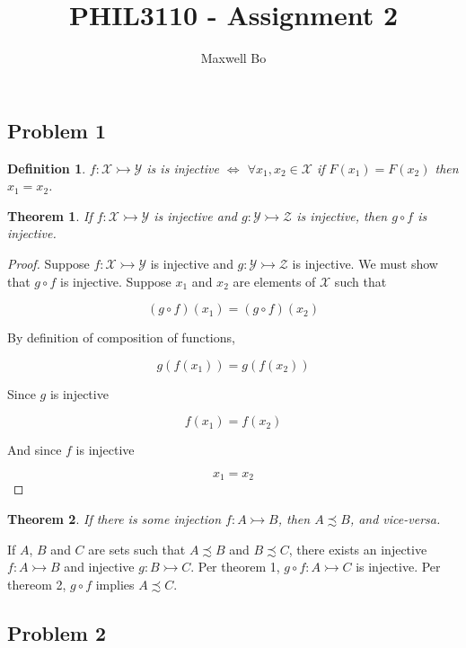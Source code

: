 \documentclass[a4paper]{article}
\title{PHIL3110 - Assignment 2}
\author{Maxwell Bo}
\newtheorem{theorem}{Theorem}
\newtheorem{definition}{Definition}
\newtheorem{proof}{Proof}
\begin{document}
 

\maketitle

\subsection*{Problem 1}

\begin{definition}
$f: \mathcal{X} \rightarrowtail \mathcal{Y}$ is is injective $\Leftrightarrow$ $\forall x_1, x_2 \in \mathcal{X}$ if $F(x_1) = F(x_2)$ then $x_1 = x_2$.
\end{definition}

\begin{theorem}
    If $f: \mathcal{X} \rightarrowtail \mathcal{Y}$ is injective and $g: \mathcal{Y} \rightarrowtail \mathcal{Z}$ is injective, then $g \circ f$ is injective.
\end{theorem}

\begin{proof}
Suppose $f: \mathcal{X} \rightarrowtail \mathcal{Y}$ is injective and $g: \mathcal{Y} \rightarrowtail \mathcal{Z}$ is injective. We must show that $g \circ f$ is injective. Suppose $x_1$ and $x_2$ are elements of $\mathcal{X}$ such that

\[(g \circ f)(x_1) = (g \circ f)(x_2)\]

By definition of composition of functions,

\[g(f(x_1)) = g(f(x_2))\]

Since $g$ is injective

\[f(x_1) = f(x_2)\]

And since $f$ is injective

\[x_1 = x_2\]

\end{proof}

\begin{theorem}
If there is some injection $f: A \rightarrowtail B$, then $A \precsim B$, and vice-versa.
\end{theorem}

If $A$, $B$ and $C$ are sets such that $A \precsim B$ and $B \precsim C$, there exists an injective $f: A \rightarrowtail B$ and injective $g: B \rightarrowtail C$. Per theorem 1, $g \circ f: A \rightarrowtail C$ is injective. Per thereom 2, $g \circ f$ implies $A \precsim C$.

\subsection*{Problem 2}
\end{document}
